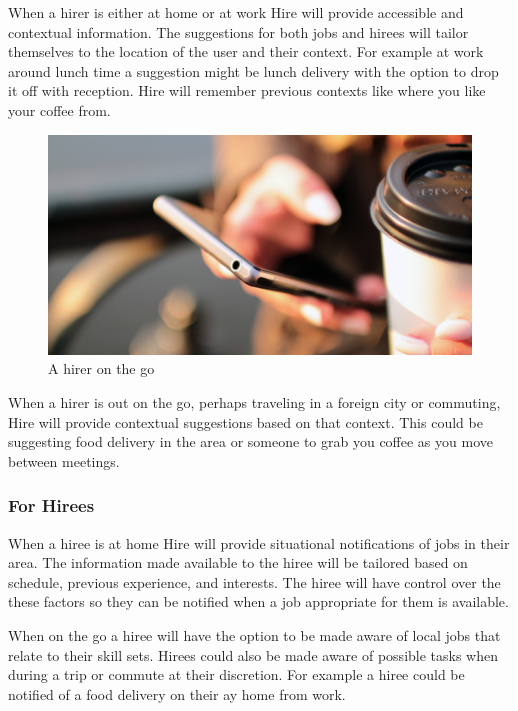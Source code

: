 \documentclass[11pt]{article}
\begin{document}
When a hirer is either at home or at work Hire will provide accessible and contextual information. The suggestions for both jobs and hirees will tailor themselves to the location of the user and their context. For example at work around lunch time a suggestion might be lunch delivery with the option to drop it off with reception. Hire will remember previous contexts like where you like your coffee from.


\begin{figure}[htb]
\begin{center}
\hspace*{-4cm}
\includegraphics[width=1.5\textwidth]{Img/hands-coffee-smartphone-technology}
\end{center}
\caption{A hirer on the go}
\end{figure}

When a hirer is out on the go, perhaps traveling in a foreign city or commuting, Hire will provide contextual suggestions based on that context. This could be suggesting food delivery in the area or someone to grab you coffee as you move between meetings.

\subsubsection{For Hirees}

When a hiree is at home Hire will provide situational notifications of jobs in their area. The information made available to the hiree will be tailored based on schedule, previous experience, and interests. The hiree will have control over the these factors so they can be notified when a job appropriate for them is available.

When on the go a hiree will have the option to be made aware of local jobs that relate to their skill sets. Hirees could also be made aware of possible tasks when during a trip or commute at their discretion. For example a hiree could be notified of a food delivery on their ay home from work.
\end{document}
